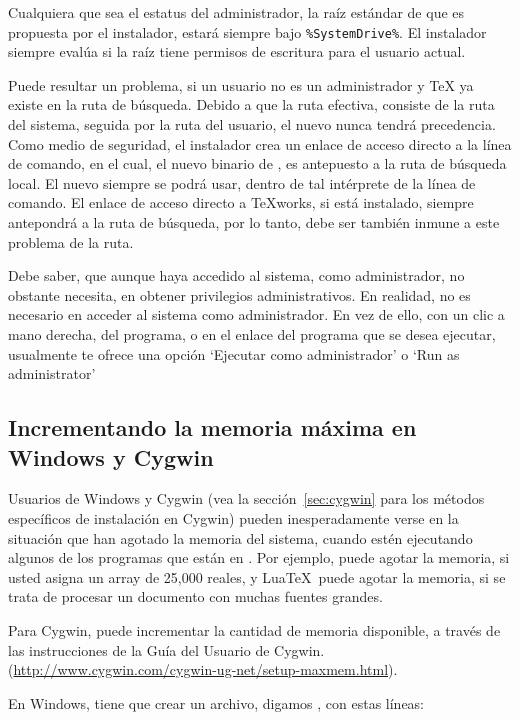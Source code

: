 \documentclass{article}
\begin{document}
Cualquiera que sea el estatus del administrador, la raíz estándar de
\TL{} que es propuesta por el instalador, estará siempre bajo
\verb|%SystemDrive%|. El instalador siempre evalúa si la raíz tiene
permisos de escritura para el usuario actual.

Puede resultar un problema, si un usuario no es un administrador y \TeX{}
ya existe en la ruta de búsqueda. Debido a que la ruta efectiva, consiste
de la ruta del sistema, seguida por la ruta del usuario, el nuevo \TL{}
nunca tendrá precedencia. Como medio de seguridad, el instalador crea un
enlace de acceso directo a la línea de comando, en el cual, el nuevo
binario de \TL{}, es antepuesto a la ruta de búsqueda local. El nuevo
\TL{} siempre se podrá usar, dentro de tal intérprete de la línea de
comando. El enlace de acceso directo a \TeX{}works, si está instalado,
siempre antepondrá \TL{} a la ruta de búsqueda, por lo tanto, debe ser
también inmune a este problema de la ruta. 

Debe saber, que aunque haya accedido al sistema, como administrador, no
obstante necesita, en obtener privilegios administrativos. En realidad, no es
necesario en acceder al sistema como administrador. En vez de ello, con un clic
a mano derecha, del programa, o en el enlace del programa que se desea
ejecutar, usualmente te ofrece una opción `Ejecutar como administrador' o `Run as administrator'

\subsection{Incrementando la memoria máxima en Windows y Cygwin}
\label{sec:cygwin-maxmem}

Usuarios de Windows y Cygwin (vea la sección~\ref{sec:cygwin} para los
métodos específicos de instalación en Cygwin) pueden inesperadamente
verse en la situación que han agotado la memoria del sistema, cuando
estén ejecutando algunos de los programas que están en \TL{}.  Por
ejemplo,  puede agotar la memoria, si usted asigna un array
de 25,000 reales, y Lua\TeX\ puede agotar la memoria, si se trata de
procesar un documento con muchas fuentes grandes. 

Para Cygwin, puede incrementar la cantidad de memoria disponible, a través
de las instrucciones de la Guía del Usuario de Cygwin.  
(\url{http://www.cygwin.com/cygwin-ug-net/setup-maxmem.html}).

En Windows, tiene que crear un archivo, digamos , con
estas líneas:
\end{document}
